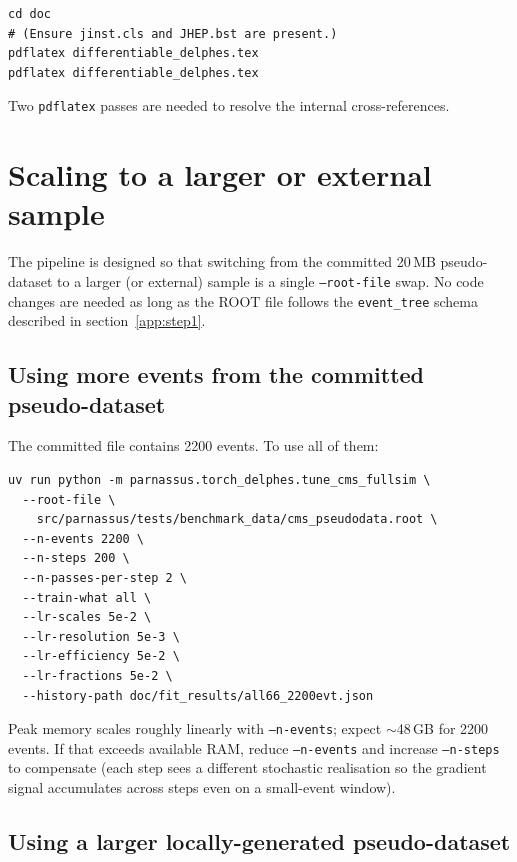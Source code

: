\documentclass[a4paper,11pt]{article}
\begin{document}
\begin{verbatim}
cd doc
# (Ensure jinst.cls and JHEP.bst are present.)
pdflatex differentiable_delphes.tex
pdflatex differentiable_delphes.tex
\end{verbatim}

Two \texttt{pdflatex} passes are needed to resolve the internal
cross-references.

\section{Scaling to a larger or external sample}
\label{app:scaling}

The pipeline is designed so that switching from the committed 20\,MB
pseudo-dataset to a larger (or external) sample is a single
\texttt{--root-file} swap. No code changes are needed as long as the
ROOT file follows the \texttt{event\_tree} schema described in
section~\ref{app:step1}.

\subsection{Using more events from the committed pseudo-dataset}

The committed file contains 2200 events. To use all of them:

\begin{verbatim}
uv run python -m parnassus.torch_delphes.tune_cms_fullsim \
  --root-file \
    src/parnassus/tests/benchmark_data/cms_pseudodata.root \
  --n-events 2200 \
  --n-steps 200 \
  --n-passes-per-step 2 \
  --train-what all \
  --lr-scales 5e-2 \
  --lr-resolution 5e-3 \
  --lr-efficiency 5e-2 \
  --lr-fractions 5e-2 \
  --history-path doc/fit_results/all66_2200evt.json
\end{verbatim}

Peak memory scales roughly linearly with \texttt{--n-events}; expect
$\sim$48\,GB for 2200 events. If that exceeds available RAM, reduce
\texttt{--n-events} and increase \texttt{--n-steps} to compensate
(each step sees a different stochastic realisation so the gradient
signal accumulates across steps even on a small-event window).

\subsection{Using a larger locally-generated pseudo-dataset}
\end{document}
